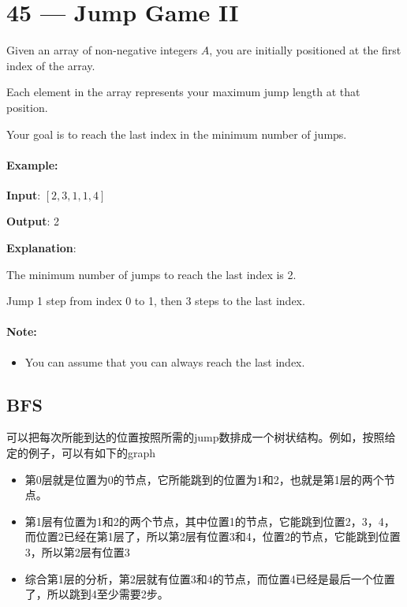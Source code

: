 \section{45 --- Jump Game II}
Given an array of non-negative integers $A$, you are initially positioned at the first index of the array.

Each element in the array represents your maximum jump length at that position.

Your goal is to reach the last index in the minimum number of jumps.

\paragraph{Example:}

\begin{flushleft}
\textbf{Input}: $[2,3,1,1,4]$

\textbf{Output}: 2

\textbf{Explanation}: 

The minimum number of jumps to reach the last index is 2. 

Jump 1 step from index 0 to 1, then 3 steps to the last index.
\end{flushleft}


\paragraph{Note:}

\begin{itemize}
\item You can assume that you can always reach the last index.
\end{itemize}


\subsection{BFS}
可以把每次所能到达的位置按照所需的jump数排成一个树状结构。例如，按照给定的例子，可以有如下的graph

\begin{itemize}
\item 第0层就是位置为0的节点，它所能跳到的位置为1和2，也就是第1层的两个节点。
\item 第1层有位置为1和2的两个节点，其中位置1的节点，它能跳到位置2，3，4，而位置2已经在第1层了，所以第2层有位置3和4，位置2的节点，它能跳到位置3，所以第2层有位置3
\item 综合第1层的分析，第2层就有位置3和4的节点，而位置4已经是最后一个位置了，所以跳到4至少需要2步。
\end{itemize}

